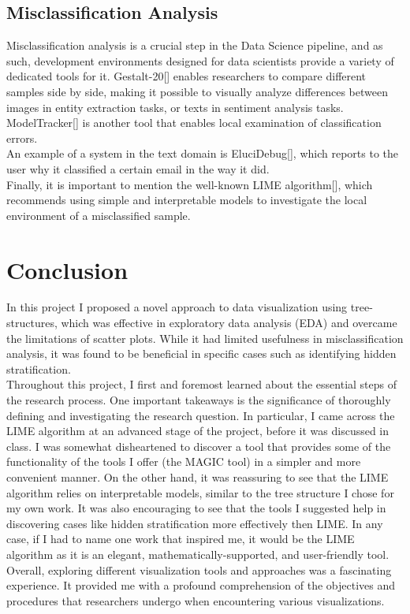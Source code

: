 \documentclass[11pt]{article}
\begin{document}
\subsection{Misclassification Analysis}\label{Misclassification Analysis
}
Misclassification analysis is a crucial step in the Data Science pipeline, and as such, development environments designed for data scientists provide a variety of dedicated tools for it. Gestalt-20[] enables researchers to compare different samples side by side, making it possible to visually analyze differences between images in entity extraction tasks, or texts in sentiment analysis tasks. ModelTracker[] is another tool that enables local examination of classification errors.\\
An example of a system in the text domain is EluciDebug[], which reports to the user why it classified a certain email in the way it did.\\
Finally, it is important to mention the well-known LIME algorithm[], which recommends using simple and interpretable models to investigate the local environment of a misclassified sample.
\section{Conclusion}\label{Conclusion}
In this project I proposed a novel approach to data visualization using tree-structures, which was effective in exploratory data analysis (EDA) and overcame the limitations of scatter plots. While it had limited usefulness in misclassification analysis, it was found to be beneficial in specific cases such as identifying hidden stratification.\\
Throughout this project, I first and foremost learned about the essential steps of the research process. One important takeaways is the significance of thoroughly defining and investigating the research question. In particular, I came across the LIME algorithm at an advanced stage of the project, before it was discussed in class. I was somewhat disheartened to discover a tool that provides some of the functionality of the tools I offer (the MAGIC tool) in a simpler and more convenient manner. On the other hand, it was reassuring to see that the LIME algorithm relies on interpretable models, similar to the tree structure I chose for my own work. It was also encouraging to see that the tools I suggested help in discovering cases like hidden stratification more effectively then LIME. In any case, if I had to name one work that inspired me, it would be the LIME algorithm as it is an elegant, mathematically-supported, and user-friendly tool.\\
Overall, exploring different visualization tools and approaches was a fascinating experience. It provided me with a profound comprehension of the objectives and procedures that researchers undergo when encountering various visualizations.


\end{document}
